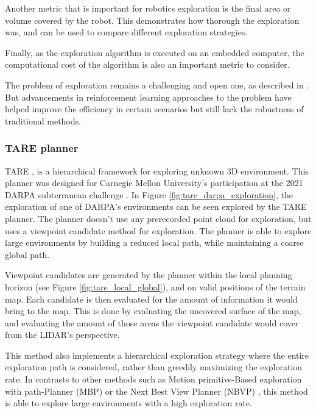 \documentclass[12pt]{article}
\begin{document}
        Another metric that is important for robotics exploration is the final area or volume covered by the robot. This demonstrates how thorough the exploration was, and can be used to compare different exploration strategies.

        Finally, as the exploration algorithm is executed on an embedded computer, the computational cost of the algorithm is also an important metric to consider. 

        The problem of exploration remains a challenging and open one, as described in \cite{lluvia2021active}. But advancements in reinforcement learning approaches to the problem \cite{garaffa2021reinforcement} have helped improve the efficiency in certain scenarios but still lack the robustness of traditional methods.

        \subsubsection{TARE planner}
        \label{section:tare_planner}

        TARE \cite{tare}, is a hierarchical framework for exploring unknown 3D environment. This planner was designed for Carnegie Mellon University's participation at the 2021 DARPA subterranean challenge \cite{darpa_subterranean_challenge}. In Figure \ref{fig:tare_darpa_exploration}, the exploration of one of DARPA's environments  can be seen explored by the TARE planner. The planner doesn't use any prerecorded point cloud for exploration, but uses a viewpoint candidate method for exploration. The planner is able to explore large environments by building a reduced local path, while maintaining a coarse global path.

        Viewpoint candidates are generated by the planner within the local planning horizon (see Figure \ref{fig:tare_local_global}), and on valid positions of the terrain map. Each candidate is then evaluated for the amount of information it would bring to the map. This is done by evaluating the uncovered surface of the map, and evaluating the amount of those areas the viewpoint candidate would cover from the LIDAR's perspective.  

        This method also implements a hierarchical exploration strategy where the entire exploration path is considered, rather than greedily maximizing the exploration rate. In contrasts to other methods such as Motion primitive-Based exploration with path-Planner (MBP) \cite{dharmadhikari2020motion} or the Next Best View Planner (NBVP) \cite{bircher2016receding}, this method is able to explore large environments with a high exploration rate.
\end{document}
